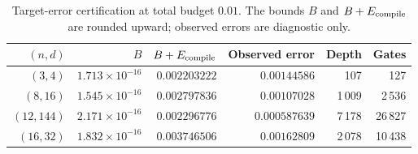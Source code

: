\begin{table}[tb]
\centering\small\setlength{\tabcolsep}{4pt}
\caption{Target-error certification at total budget $0.01$. The bounds $B$ and $B+E_{\rm compile}$ are rounded upward; observed errors are diagnostic only.}\label{tab:errorresources}
\begin{tabular}{@{}rrrrrr@{}}
\toprule
$(n,d)$ & $B$ & $B+E_{\rm compile}$ & Observed error & Depth & Gates\\
\midrule
$(3,4)$ & $1.713\times10^{-16}$ & $0.002203222$ & $0.00144586$ & 107 & 127 \\
$(8,16)$ & $1.545\times10^{-16}$ & $0.002797836$ & $0.00107028$ & 1\,009 & 2\,536 \\
$(12,144)$ & $2.171\times10^{-16}$ & $0.002296776$ & $0.000587639$ & 7\,178 & 26\,827 \\
$(16,32)$ & $1.832\times10^{-16}$ & $0.003746506$ & $0.00162809$ & 2\,078 & 10\,438 \\
\bottomrule
\end{tabular}
\end{table}
